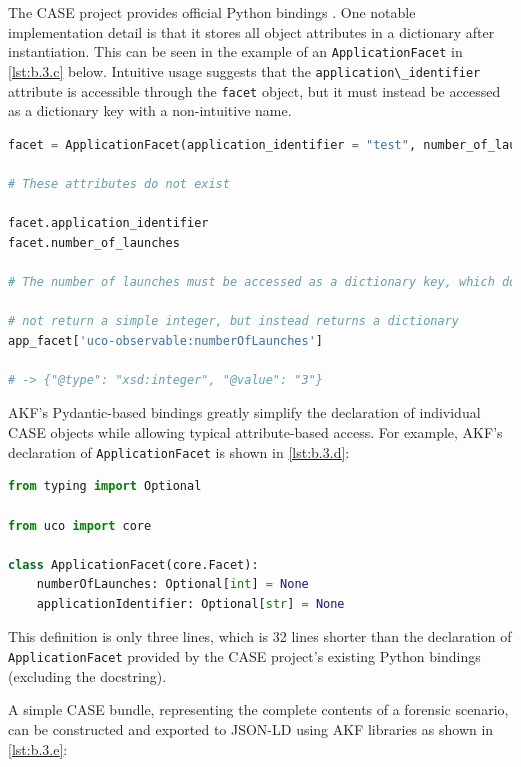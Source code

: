 \documentclass[letterpaper,12pt]{report}
\newcommand{\passthrough}[1]{#1}
\begin{document}
The CASE project provides official Python bindings
\cite{CaseworkCASEMappingPython}. One notable implementation detail
is that it stores all object attributes in a dictionary after
instantiation. This can be seen in the example of an
\passthrough{\lstinline!ApplicationFacet!} in \autoref{lst:b.3.c} below.
Intuitive usage suggests that the
\passthrough{\lstinline!application\_identifier!} attribute is
accessible through the \passthrough{\lstinline!facet!} object, but it
must instead be accessed as a dictionary key with a non-intuitive name.

\begin{lstlisting}[label={lst:b.3.c}, caption={Sample usage of official CASE Python bindings \cite{CaseworkCASEMappingPython}}, language=Python]
facet = ApplicationFacet(application_identifier = "test", number_of_launches=3)

# These attributes do not exist

facet.application_identifier
facet.number_of_launches

# The number of launches must be accessed as a dictionary key, which does

# not return a simple integer, but instead returns a dictionary
app_facet['uco-observable:numberOfLaunches']

# -> {"@type": "xsd:integer", "@value": "3"}
\end{lstlisting}

AKF's Pydantic-based bindings greatly simplify the declaration of
individual CASE objects while allowing typical attribute-based access.
For example, AKF's declaration of
\passthrough{\lstinline!ApplicationFacet!} is shown in
\autoref{lst:b.3.d}:

\begin{lstlisting}[label={lst:b.3.d}, caption={Example of Pydantic-based CASE object declaration used by AKF}, language=Python]
from typing import Optional

from uco import core

class ApplicationFacet(core.Facet):
    numberOfLaunches: Optional[int] = None
    applicationIdentifier: Optional[str] = None
\end{lstlisting}

This definition is only three lines, which is 32 lines shorter than the
declaration of \passthrough{\lstinline!ApplicationFacet!} provided by
the CASE project's existing Python bindings (excluding the docstring).

A simple CASE bundle, representing the complete contents of a forensic
scenario, can be constructed and exported to JSON-LD using AKF libraries
as shown in \autoref{lst:b.3.e}:
\end{document}
